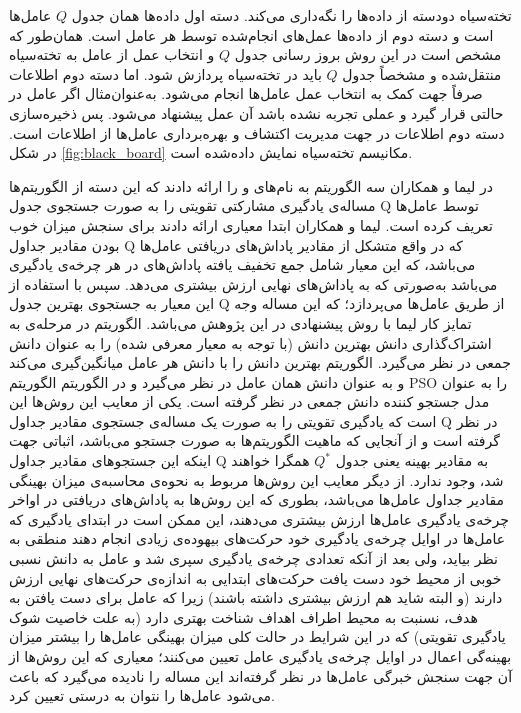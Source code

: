تخته‌سیاه دودسته از داده‌ها را نگه‌داری می‌کند. دسته اول داده‌ها همان جدول $Q$ عامل‌ها است و دسته دوم از داده‌ها عمل‌های انجام‌شده توسط هر عامل است. همان‌طور که مشخص است در این روش بروز رسانی جدول $Q$ و انتخاب عمل از عامل به تخته‌سیاه منتقل‌شده و مشخصاً جدول $Q$ باید در تخته‌سیاه پردازش شود. اما دسته دوم اطلاعات صرفاً جهت کمک به انتخاب عمل عامل‌ها انجام می‌شود. به‌عنوان‌مثال اگر عامل در حالتی قرار گیرد و عملی تجربه نشده باشد آن عمل پیشنهاد می‌شود. پس ذخیره‌سازی دسته دوم اطلاعات در جهت مدیریت اکتشاف و بهره‌برداری عامل‌ها از اطلاعات است. در شکل \ref{fig:black_board} مکانیسم تخته‌سیاه نمایش داده‌شده است.


در  لیما و همکاران سه الگوریتم به نام‌های  و  را ارائه دادند که این دسته از الگوریتم‌ها مساله‌ی یادگیری مشارکتی تقویتی را به صورت جستجوی‌ جدول Q توسط عامل‌ها تعریف کرده است. لیما و همکاران ابتدا معیاری ارائه دادند برای سنجش میزان خوب بودن مقادیر جداول Q که در واقع متشکل از مقادیر پاداش‌های دریافتی عامل‌ها می‌باشد، که این معیار شامل جمع تخفیف یافته پاداش‌های در هر چرخه‌ی یادگیری می‌باشد به‌صورتی که به پاداش‌های نهایی ارزش بیشتری می‌دهد. سپس با استفاده از این معیار به جستجوی بهترین جدول Q از طریق عامل‌ها می‌پردازد؛ که این مساله وجه تمایز کار لیما با روش پیشنهادی در این پژوهش می‌باشد. الگوریتم  در مرحله‌ی به اشتراک‌گذاری دانش بهترین دانش (با توجه به معیار معرفی شده) را به عنوان دانش جمعی در نظر می‌گیرد. الگوریتم  بهترین دانش را با دانش هر عامل میانگین‌گیری می‌کند و به عنوان دانش همان عامل در نظر می‌گیرد و در الگوریتم  الگوریتم PSO را به عنوان مدل جستجو کننده‌ دانش جمعی در نظر گرفته است.
یکی از معایب این روش‌ها این است که یادگیری تقویتی را به صورت یک مساله‌ی جستجوی مقادیر جداول Q در نظر گرفته است و از آنجایی که ماهیت الگوریتم‌ها به صورت جستجو می‌باشد، اثباتی جهت اینکه این جستجو‌های مقادیر جداول Q به مقادیر بهینه یعنی جدول $Q^*$ همگرا خواهند شد، وجود ندارد. از دیگر معایب این روش‌ها مربوط به نحوه‌ی محاسبه‌ی میزان بهینگی مقادیر جداول عامل‌ها می‌باشد، بطوری که این روش‌ها به پاداش‌های دریافتی در اواخر چرخه‌ی یادگیری عامل‌ها ارزش بیشتری می‌دهند، این ممکن است در ابتدای یادگیری که عامل‌ها در اوایل چرخه‌ی یادگیری خود حرکت‌های بیهوده‌ی زیادی انجام دهند منطقی به نظر بیاید، ولی بعد از آنکه تعدادی چرخه‌ی یادگیری سپری شد و عامل به دانش نسبی خوبی از محیط خود دست یافت حرکت‌های ابتدایی به اندازه‌ی حرکت‌های نهایی ارزش دارند (و البته شاید هم ارزش بیشتری داشته باشند) زیرا که عامل برای دست یافتن به هدف، نسنبت به محیط‌ اطراف اهداف شناخت بهتری دارد (به علت خاصیت شوک یادگیری تقویتی) که در این شرایط در حالت کلی میزان بهینگی عامل‌ها را بیشتر میزان بهینه‌گی اعمال در اوایل چرخه‌ی یادگیری عامل تعیین می‌کنند؛ معیاری که این روش‌ها از آن جهت سنجش خبرگی عامل‌ها در نظر گرفته‌اند این مساله را نادیده می‌گیرد که باعث می‌شود عامل‌ها را نتوان به درستی تعیین کرد.

